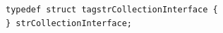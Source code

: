 \begin{verbatim}
typedef struct tagstrCollectionInterface {
} strCollectionInterface;
\end{verbatim}
